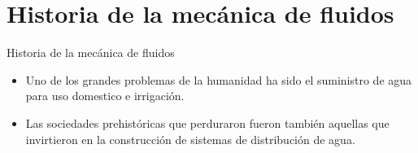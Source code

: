 \documentclass [xcolor=svgnames, t] {beamer}
\begin{document}
\section{Historia de la mec\'anica de fluidos}
\begin{frame}{Historia de la mec\'anica de fluidos}
\begin{exampleblock}{}
\begin{itemize}
\item Uno de los grandes problemas de la humanidad ha sido el suministro de agua para uso domestico e irrigación.
\item Las sociedades prehistóricas que perduraron fueron también aquellas que invirtieron en la construcción de sistemas de distribución de agua.
\end{itemize}
\end{exampleblock}
\end{frame}
\end{document}
